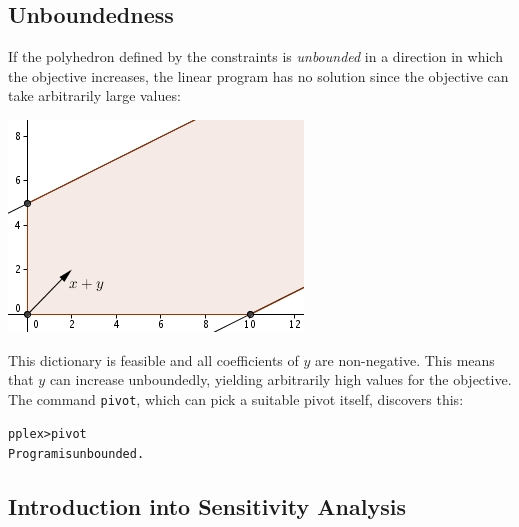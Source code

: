 \documentclass[ukenglish]{nik}
\begin{document}
\subsection{Unboundedness}\label{sec:unbounded}
If the polyhedron defined by the constraints is 
\emph{unbounded} in a direction in which the objective increases, the linear program has no solution
since the objective can take arbitrarily large values:

\vspace{.2cm}
\begin{minipage}{.55\textwidth}
\begin{alltt}

\end{alltt}
\end{minipage}
\begin{minipage}{.45\textwidth}
	\includegraphics{ex_unbound.jpg}
\end{minipage}
This dictionary is feasible and all coefficients of $y$ are non-negative. 
This means that $y$ can increase unboundedly, 
yielding arbitrarily high values for the objective.
The command \verb|pivot|, which can pick a suitable pivot itself,
discovers this:
\begin{alltt}
pplex> pivot
Program is unbounded.
\end{alltt}

\subsection{Introduction into Sensitivity Analysis}
\end{document}
